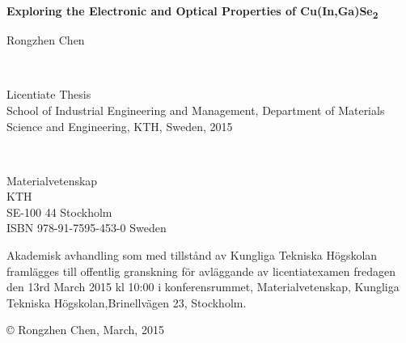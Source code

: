 \documentclass[a4paper, 12pt, titlepage,oneside,drop]{kthesis}
\begin{document}
\setcounter{page}{1}

\begin{center}




  \vspace{5 cm}





  \vspace{12pt}
  {\LARGE{\textbf{Exploring the Electronic and Optical Properties of Cu(In,Ga)Se\textsubscript{2} }}}
  \vspace{12pt}

  \vspace{5 cm}

  {\large{Rongzhen Chen}}


  \vfill 

  \ 

  \large{Licentiate Thesis}
  \\
  \large{School of Industrial Engineering and Management,
  Department of Materials Science and Engineering,
  KTH, Sweden, 2015}

\end{center}

 \thispagestyle{empty}



\newpage
\setcounter{page}{2}
\thispagestyle{empty}
\
\vfill

\begin{flushright}
 Materialvetenskap\\
 KTH\\
\hfill SE-100 44 Stockholm\\ ISBN 978-91-7595-453-0  \hfill
Sweden\\
\end{flushright}


\vspace{5mm}

Akademisk avhandling som med tillstånd av Kungliga Tekniska
Högskolan framlägges till offentlig granskning för avläggande av
licentiatexamen fredagen den 13rd March 2015 kl 10:00 i konferensrummet, Materialvetenskap, Kungliga Tekniska
Högskolan,\linebreak Brinellvägen 23, Stockholm.

\vspace{5mm}

\copyright \hspace{3pt} {Rongzhen Chen, March, 2015}
\end{document}
